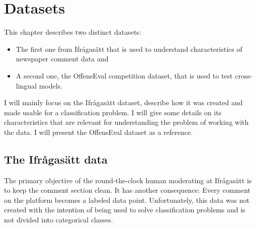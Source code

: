 \documentclass[nofilelist]{cslthse-msc}
\begin{document}

\chapter{Datasets}

This chapter describes two distinct datasets:
\begin{itemize}
    \item The first one from Ifrågasätt that is used to understand characteristics of newspaper comment data and 
    \item A second one, the OffensEval competition dataset, that is used to test cross-lingual models. 
\end{itemize} 

I will mainly focus on the Ifrågasätt dataset, describe how it was created and made usable for a classification problem. I will give some details on its characteristics that are relevant for understanding the problem of working with the data. I will present the OffensEval dataset as a reference.

\section{The Ifrågasätt data}

The primary objective of the round-the-clock human moderating at Ifrågasätt is to keep the comment section clean. It has another consequence: Every comment on the platform becomes a labeled data point. Unfortunately, this data was not created with the intention of being used to solve classification problems and is not divided into categorical classes.
\end{document}
